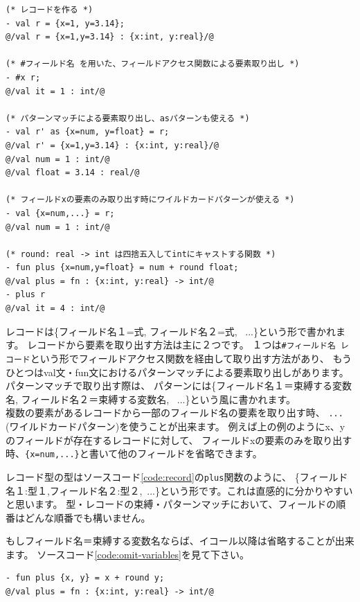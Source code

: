 \documentclass[11pt,a4paper]{article}
\begin{document}
\begin{lstlisting}[caption=レコードの例,label=code:record]
(* レコードを作る *)
- val r = {x=1, y=3.14};
@/val r = {x=1,y=3.14} : {x:int, y:real}/@

(* #フィールド名 を用いた、フィールドアクセス関数による要素取り出し *)
- #x r;
@/val it = 1 : int/@

(* パターンマッチによる要素取り出し、asパターンも使える *)
- val r' as {x=num, y=float} = r;
@/val r' = {x=1,y=3.14} : {x:int, y:real}/@
@/val num = 1 : int/@
@/val float = 3.14 : real/@

(* フィールドxの要素のみ取り出す時にワイルドカードパターンが使える *)
- val {x=num,...} = r;
@/val num = 1 : int/@

(* round: real -> int は四捨五入してintにキャストする関数 *)
- fun plus {x=num,y=float} = num + round float;
@/val plus = fn : {x:int, y:real} -> int/@
- plus r
@/val it = 4 : int/@
\end{lstlisting}

レコードは\{フィールド名１=式, フィールド名２=式, \ ...\}という形で書かれます。
レコードから要素を取り出す方法は主に２つです。
１つは\lstinline{#フィールド名 レコード}という形でフィールドアクセス関数を経由して取り出す方法があり、
もうひとつはval文・fun文におけるパターンマッチによる要素取り出しがあります。
パターンマッチで取り出す際は、
パターンには\{フィールド名１＝束縛する変数名, フィールド名２＝束縛する変数名, \ ...\}という風に書かれます。\\
複数の要素があるレコードから一部のフィールド名の要素を取り出す時、
\lstinline{...}(ワイルドカードパターン)を使うことが出来ます。
例えば上の例のようにx、yのフィールドが存在するレコードに対して、
フィールドxの要素のみを取り出す時、\lstinline|{x=num,...}|と書いて他のフィールドを省略できます。

レコード型の型はソースコード\ref{code:record}の\lstinline{plus}関数のように、
\{フィールド名１:型１,フィールド名２:型２,\ ...\}という形です。これは直感的に分かりやすいと思います。
型・レコードの束縛・パターンマッチにおいて、フィールドの順番はどんな順番でも構いません。

もしフィールド名＝束縛する変数名ならば、イコール以降は省略することが出来ます。
ソースコード\ref{code:omit-variables}を見て下さい。

\begin{lstlisting}[caption=レコードのパターンマッチ時の変数名の省略,label=code:omit-variables]
- fun plus {x, y} = x + round y;
@/val plus = fn : {x:int, y:real} -> int/@
\end{lstlisting}
\end{document}
